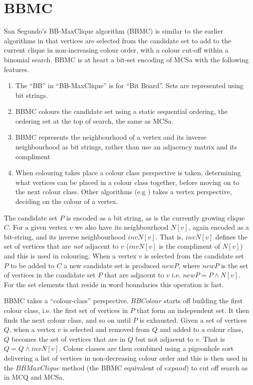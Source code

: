 \documentclass{l4proj}
\begin{document}
%
\section{BBMC}
\label{sec:bbmc}
San Segundo's BB-MaxClique algorithm \cite{segundo2011} (BBMC) 
is similar to the earlier algorithms in that vertices are selected from the candidate set to add to the current clique
in non-increasing colour order, with a colour cut-off within a binomial search. BBMC is at heart a bit-set encoding of MCSa with
the following features.
\begin{enumerate}
\item The ``BB'' in ``BB-MaxClique'' is for ``Bit Board''. Sets are represented using bit strings.
\item BBMC colours the candidate set using a static sequential ordering, the ordering set at the top of search, the same as MCSa.
\item BBMC represents the neighbourhood of a vertex and its inverse neighbourhood as bit strings, rather than use
an adjacency matrix and its compliment
\item When colouring takes place a colour class perspective is taken, determining what vertices can be placed in a colour class together, 
before moving on to the next colour class. Other algorithms (e.g \cite{tomita2003,tomita2010}) takes a vertex perspective, deciding on the colour 
of a vertex.
\end{enumerate}

\noindent
The candidate set $P$ is encoded as a bit string, as is
the currently growing clique $C$. For a given vertex $v$ we also have its neighbourhood $N[v]$, again encoded as a bit-string, and
its inverse neighbourhood $invN[v]$. That is, $invN[v]$ defines the set of vertices that are \emph{not} adjacent to $v$ ($invN[v]$ is the
compliment of $N[v]$) and this is
used in colouring. When a vertex $v$ is selected from the candidate set $P$ to be added to $C$ a new candidate set 
is produced $newP$, where $newP$ is the set of vertices in the
candidate set $P$ that are adjacent to $v$ i.e. $newP = P \land N[v]$. 
For the set elements that reside in word boundaries this operation is fast.

BBMC takes a ``colour-class'' perspective. $BBColour$ starts off building the first colour class, i.e. the first 
set of vertices in $P$ that form an independent set. It then finds the next colour class, and so on until $P$ is exhausted.
Given a set of vertices $Q$, when a vertex $v$ is selected and removed from $Q$ and added to a colour class, 
$Q$ becomes the set of vertices that are 
in $Q$ but not adjacent to $v$. That is $Q = Q \land invN[v]$.
Colour classes are then combined using a pigeonhole sort delivering a list of vertices in non-decreasing colour order and
this is then used in the $BBMaxClique$ method (the BBMC equivalent of $expand$) to cut off search as in MCQ and MCSa. 
\end{document}
